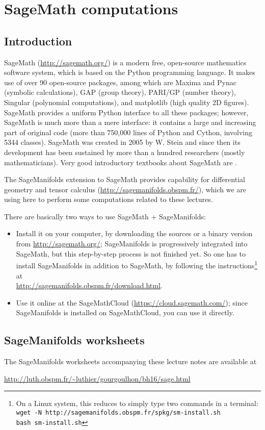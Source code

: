 \chapter{SageMath computations} \label{s:sam}

\minitoc

\section{Introduction}


\textsf{SageMath} (\url{http://sagemath.org/}) is a modern free,
open-source mathematics software system, which is
based on the Python programming language. It makes use of over 90 open-source packages,
among which are \textsf{Maxima} and \textsf{Pynac} (symbolic calculations),
\textsf{GAP} (group theory),
\textsf{PARI/GP} (number theory), \textsf{Singular} (polynomial computations),
and \textsf{matplotlib} (high quality 2D figures).
\textsf{SageMath} provides a uniform Python interface to all these packages; however,
\textsf{SageMath} is much more than a mere interface: it contains a large and increasing part of
original code (more than 750,000 lines of Python and Cython, involving 5344 classes).
\textsf{SageMath} was created in 2005 by W. Stein \cite{SteinJ05} and since
then its development has been sustained by more than a hundred researchers
(mostly mathematicians). Very good introductory textbooks about \textsf{SageMath} are
\cite{JoyneS14,Zimme13,Bard15}.

The \textsf{SageManifolds} extension to
\textsf{SageMath} provides capability for differential geometry and tensor calculus
(\url{http://sagemanifolds.obspm.fr/}), which we are using here to perform
some computations related to these lectures.

There are basically two ways to use \textsf{SageMath} + \textsf{SageManifolds}:
\begin{itemize}
\item Install it on your computer, by downloading the sources or a binary version
from \url{http://sagemath.org/}; \textsf{SageManifolds} is progressively integrated
into \textsf{SageMath}, but this step-by-step process is not finished yet. So
one has to install \textsf{SageManifolds} in addition to \textsf{SageMath}, by
following the instructions\footnote{On a Linux system, this reduces to simply type
two commands in a terminal:\\
\texttt{wget -N http://sagemanifolds.obspm.fr/spkg/sm-install.sh}\\
\texttt{bash sm-install.sh}}
at \\ \url{http://sagemanifolds.obspm.fr/download.html}.
\item Use it online at the \textsf{SageMathCloud} (\url{https://cloud.sagemath.com/});
since \textsf{SageManifolds} is installed on \textsf{SageMathCloud}, you can
use it directly.
\end{itemize}

\section{SageManifolds worksheets} \label{s:sam:worksheets}

The SageManifolds worksheets accompanying these lecture notes are available
at\\

\centerline{
\url{http://luth.obspm.fr/~luthier/gourgoulhon/bh16/sage.html}}


